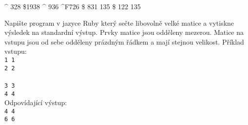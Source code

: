 \documentclass[addpoints,12pt]{exam}
\begin{document}
\begin{questions}
\nopagebreak
\begin{choices}
\^{} 328
\${}1938
\^{} 936
\^{}F726
\${} 831
 135
\${} 122
 135
\end{choices}
\question[2]
Napište program v jazyce Ruby který sečte libovolně velké matice a vytiskne výsledek na standardní výstup. Prvky matice jsou odděleny mezerou. Matice na vstupu jsou od sebe odděleny prázdným řádkem a mají stejnou velikost. Příklad vstupu:\\
\texttt{1 1\\
2 2\\
\\
3 3\\
4 4}\\
Odpovídající výstup:\\
\texttt{4 4\\
6 6}\\


\end{questions}
\end{document}
